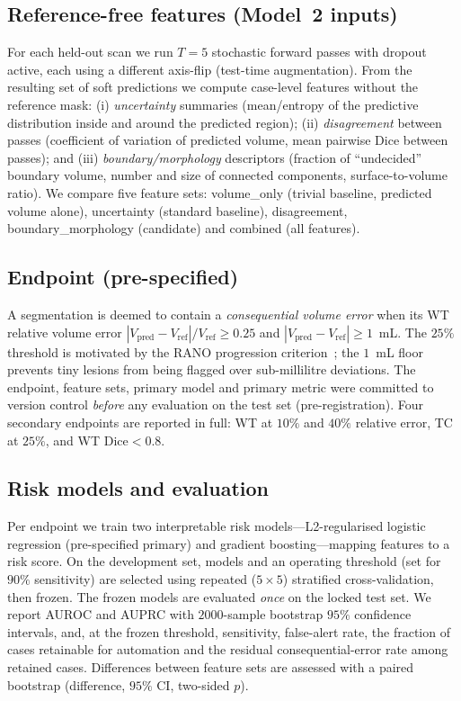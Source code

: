 \documentclass[11pt]{article}
\begin{document}
\subsection{Reference-free features (Model~2 inputs)}
For each held-out scan we run $T{=}5$ stochastic forward passes with dropout active,
each using a different axis-flip (test-time augmentation). From the resulting set of
soft predictions we compute case-level features without the reference mask:
(i) \emph{uncertainty} summaries (mean/entropy of the predictive distribution inside and
around the predicted region); (ii) \emph{disagreement} between passes (coefficient of
variation of predicted volume, mean pairwise Dice between passes); and
(iii) \emph{boundary/morphology} descriptors (fraction of ``undecided'' boundary volume,
number and size of connected components, surface-to-volume ratio). We compare five
feature sets: \textsf{volume\_only} (trivial baseline, predicted volume alone),
\textsf{uncertainty} (standard baseline), \textsf{disagreement},
\textsf{boundary\_morphology} (candidate) and \textsf{combined} (all features).

\subsection{Endpoint (pre-specified)}
A segmentation is deemed to contain a \emph{consequential volume error} when its WT
relative volume error $|V_{\text{pred}}-V_{\text{ref}}|/V_{\text{ref}} \geq 0.25$ and
$|V_{\text{pred}}-V_{\text{ref}}| \geq 1$~mL. The $25\%$ threshold is motivated by the
RANO progression criterion~\cite{wen2010}; the $1$~mL floor prevents tiny lesions from
being flagged over sub-millilitre deviations. The endpoint, feature sets, primary model
and primary metric were committed to version control \emph{before} any evaluation on the
test set (pre-registration). Four secondary endpoints are reported in full: WT at $10\%$
and $40\%$ relative error, TC at $25\%$, and WT Dice${<}0.8$.

\subsection{Risk models and evaluation}
Per endpoint we train two interpretable risk models---L2-regularised logistic regression
(pre-specified primary) and gradient boosting---mapping features to a risk score. On the
development set, models and an operating threshold (set for $90\%$ sensitivity) are
selected using repeated ($5\times5$) stratified cross-validation, then frozen. The frozen
models are evaluated \emph{once} on the locked test set. We report AUROC and AUPRC with
$2000$-sample bootstrap $95\%$ confidence intervals, and, at the frozen threshold,
sensitivity, false-alert rate, the fraction of cases retainable for automation and the
residual consequential-error rate among retained cases. Differences between feature sets
are assessed with a paired bootstrap (difference, $95\%$ CI, two-sided $p$).
\end{document}

